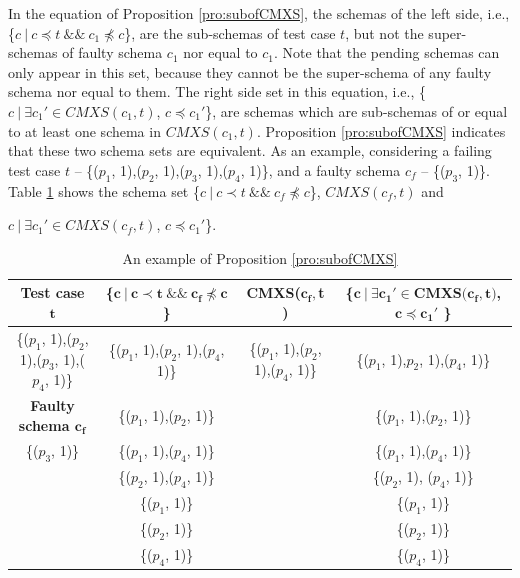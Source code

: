 \documentclass{sig-alternate-05-2015}
\begin{document}
In the equation of Proposition \ref{pro:subofCMXS}, the schemas of the left side, i.e., \{$c\ |\ c \preceq t\ \&\&\ c_{1} \npreceq c$\}, are the sub-schemas of test case $t$, but not the super-schemas of faulty schema $c_{1}$ nor equal to $c_{1}$.  Note that the pending schemas can only appear in this set, because they cannot be the super-schema of any faulty schema nor equal to them. The right side set in this equation, i.e., \{$ c\ |\ \exists c_{1}' \in CMXS(c_{1}, t)$, $c \preceq c_{1}'$\}, are schemas which are sub-schemas of or equal to at least one schema in $CMXS(c_{1}, t)$. Proposition \ref{pro:subofCMXS} indicates that these two schema sets are equivalent. As an example, considering a failing test case $t$ -- \{($p_{1}$, 1),($p_{2}$, 1),($p_{3}$, 1),($p_{4}$, 1)\}, and a faulty schema $c_{f}$ --  \{($p_{3}$, 1)\}. Table \ref{examleOfCMXSPro} shows the schema set  \{$c\ |\ c \prec t\ \&\&\ c_{f} \npreceq c$\}, $CMXS(c_{f}, t)$ and {$ c\ |\ \exists c_{1}' \in CMXS(c_{f}, t)$, $c \preceq c_{1}'$\}.

\begin{table}[ht]
  \centering
  \setlength{\tabcolsep}{3pt}
  \caption{An example of Proposition \ref{pro:subofCMXS}}
    \begin{tabular}{|c|c|c|c|}
    \hline
  \textbf{  Test case $\textbf{t}$} & \textbf{ \{$\textbf{c}\ |\ \textbf{c} \prec \textbf{t}\ \&\&\ \textbf{c}_{\textbf{f}} \npreceq \textbf{c}$\} }& \textbf{ CMXS($\textbf{c}_{\textbf{f}}, $\textbf{t}$ $)} & \textbf{\{$ \textbf{c}\ |\ \exists \textbf{c}_{\textbf{1}}' \in \textbf{CMXS}\textbf{(}\textbf{c}_{\textbf{f}}, \textbf{t}\textbf{)}$, $\textbf{c} \preceq \textbf{c}_{\textbf{1}}'$ \}}\\\hline
    \{($p_{1}$, 1),($p_{2}$, 1),($p_{3}$, 1),($p_{4}$, 1)\}  & \{($p_{1}$, 1),($p_{2}$, 1),($p_{4}$, 1)\} & \{($p_{1}$, 1),($p_{2}$, 1),($p_{4}$, 1)\} & \{($p_{1}$, 1),$p_{2}$, 1),($p_{4}$, 1)\}\\ \cline{1-1}
      \textbf{Faulty schema $\textbf{c}_{\textbf{f}}$}  & \{($p_{1}$, 1),($p_{2}$, 1)\} &  & \{($p_{1}$, 1),($p_{2}$, 1)\} \\\cline{1-1}
     \{($p_{3}$, 1)\}         & \{($p_{1}$, 1),($p_{4}$, 1)\}&  &\{($p_{1}$, 1),($p_{4}$, 1)\}\\
          &       \{($p_{2}$, 1),($p_{4}$, 1)\} &  &\{($p_{2}$, 1), ($p_{4}$, 1)\}\\
          &       \{($p_{1}$, 1)\} &  &\{($p_{1}$, 1)\}\\
          &       \{($p_{2}$, 1)\} &  &\{($p_{2}$, 1)\}\\
          &       \{($p_{4}$, 1)\} &  & \{($p_{4}$, 1)\}\\\hline
    \end{tabular}%
  \label{examleOfCMXSPro}%
\end{table}%

}
\end{document}
